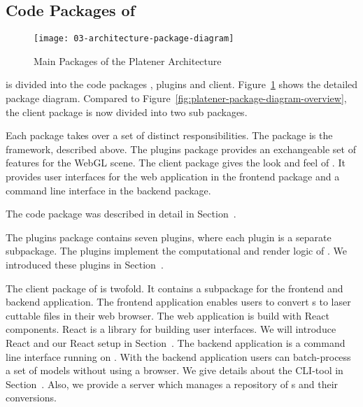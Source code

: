 \documentclass[../../ClassicThesis.tex]{subfiles}
\begin{document}


\subsection{Code Packages of {\platener}}
\label{sec:code-packages-platener}





\begin{figure}
  \centering
  \texttt{[image: 03-architecture-package-diagram]}
  \caption{Main Packages of the Platener Architecture}
  \label{fig:package-diagram}
\end{figure}

{\platener} is divided into the code packages {\convertify},
plugins and client. Figure~\ref{fig:package-diagram} shows
the detailed package diagram. Compared to
Figure~\ref{fig:platener-package-diagram-overview}, the
client package is now divided into two sub packages.

Each package takes over a set of distinct responsibilities.
The {\convertify} package is the framework, described above.
The plugins package provides an exchangeable set of features
for the WebGL scene. The client package gives the look and
feel of {\platener}. It provides user interfaces for the web
application in the frontend package and a command line
interface in the backend package.

The {\convertify} code package was described in detail in
Section~.

The plugins package contains seven plugins, where each plugin is a
separate subpackage. The plugins implement the computational and
render logic of {\platener}. We introduced these plugins in
Section~.


The client package of {\platener} is twofold. It contains a
subpackage for the frontend and backend application. The
frontend application enables users to convert
{\threedmodel}s to laser cuttable files in their web
browser. The web application is build with React components.
React is a {\javascript} library for building user
interfaces. We will introduce React and our React setup in
Section~. The backend application is
a command line interface running on {\nodejs}. With the
backend application users can batch-process a set of models
without using a browser. We give details about the CLI-tool
in Section~. Also, we provide a server
which manages a repository of {\threedmodel}s and their
conversions.
\end{document}
